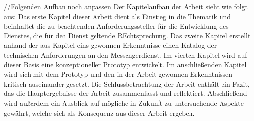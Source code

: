 //Folgenden Aufbau noch anpassen
Der Kapitelaufbau der Arbeit sieht wie folgt aus: Das erste Kapitel dieser Arbeit dient als Einstieg in die Thematik und beinhaltet die zu beachtenden Anforderungssteller für die Entwicklung des Dienstes, die für den Dienst geltende REchtsprechung. Das zweite Kapitel erstellt anhand der aus Kapitel eins gewonnen Erkenntnisse einen Katalog der technischen Anforderungen an den Messengerdienst. Im vierten Kapitel wird auf dieser Basis eine konzeptioneller Prototyp entwickelt. Im anschließenden Kapitel wird sich mit dem Prototyp und den in der Arbeit gewonnen Erkenntnissen kritisch auseinander gesetzt. Die Schlussbetrachtung der Arbeit enthält ein Fazit, das die Hauptergebnisse der Arbeit zusammenfasst und reflektiert. Abschließend wird außerdem ein Ausblick auf mögliche in Zukunft zu untersuchende Aspekte gewährt, welche sich als Konsequenz aus dieser Arbeit ergeben.
